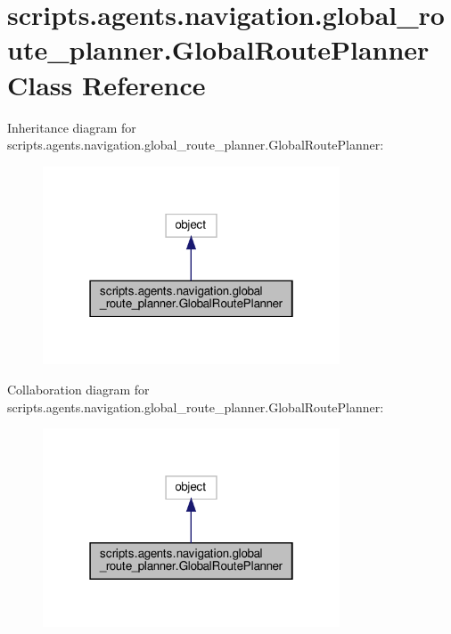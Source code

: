 \hypertarget{classscripts_1_1agents_1_1navigation_1_1global__route__planner_1_1GlobalRoutePlanner}{}\section{scripts.\+agents.\+navigation.\+global\+\_\+route\+\_\+planner.\+Global\+Route\+Planner Class Reference}
\label{classscripts_1_1agents_1_1navigation_1_1global__route__planner_1_1GlobalRoutePlanner}


Inheritance diagram for scripts.\+agents.\+navigation.\+global\+\_\+route\+\_\+planner.\+Global\+Route\+Planner\+:
\nopagebreak
\begin{figure}[H]
\begin{center}
\leavevmode
\includegraphics[width=250pt]{d8/d27/classscripts_1_1agents_1_1navigation_1_1global__route__planner_1_1GlobalRoutePlanner__inherit__graph}
\end{center}
\end{figure}


Collaboration diagram for scripts.\+agents.\+navigation.\+global\+\_\+route\+\_\+planner.\+Global\+Route\+Planner\+:
\nopagebreak
\begin{figure}[H]
\begin{center}
\leavevmode
\includegraphics[width=250pt]{db/db5/classscripts_1_1agents_1_1navigation_1_1global__route__planner_1_1GlobalRoutePlanner__coll__graph}
\end{center}
\end{figure}
